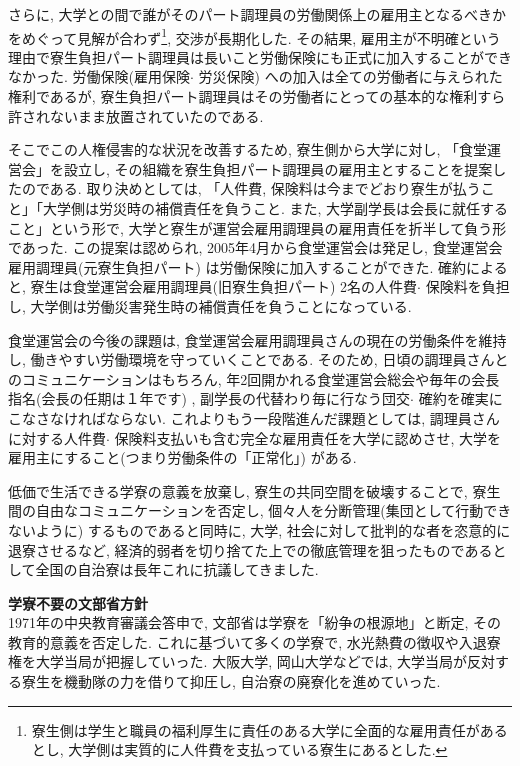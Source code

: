 \documentclass[10pt,b5jsbook,dvips,dvipdfmx,openany]{jsbook}
\theoremstyle{definition}
\begin{document}
		さらに, 大学との間で誰がそのパート調理員の労働関係上の雇用主となるべきかをめぐって見解が合わず\footnote{寮生側は学生と職員の福利厚生に責任のある大学に全面的な雇用責任があるとし, 大学側は実質的に人件費を支払っている寮生にあるとした. }, 交渉が長期化した. その結果, 雇用主が不明確という理由で寮生負担パート調理員は長いこと労働保険にも正式に加入することができなかった. 労働保険(雇用保険$ \cdot $ 労災保険) への加入は全ての労働者に与えられた権利であるが, 寮生負担パート調理員はその労働者にとっての基本的な権利すら許されないまま放置されていたのである. 

		そこでこの人権侵害的な状況を改善するため, 寮生側から大学に対し, 「食堂運営会」を設立し, その組織を寮生負担パート調理員の雇用主とすることを提案したのである. 取り決めとしては, 「人件費, 保険料は今までどおり寮生が払うこと」「大学側は労災時の補償責任を負うこと. また, 大学副学長は会長に就任すること」という形で, 大学と寮生が運営会雇用調理員の雇用責任を折半して負う形であった. この提案は認められ, 2005年4月から食堂運営会は発足し, 食堂運営会雇用調理員(元寮生負担パート) は労働保険に加入することができた. 確約によると, 寮生は食堂運営会雇用調理員(旧寮生負担パート) 2名の人件費$ \cdot $ 保険料を負担し, 大学側は労働災害発生時の補償責任を負うことになっている. 

		食堂運営会の今後の課題は, 食堂運営会雇用調理員さんの現在の労働条件を維持し, 働きやすい労働環境を守っていくことである. そのため, 日頃の調理員さんとのコミュニケーションはもちろん, 年2回開かれる食堂運営会総会や毎年の会長指名(会長の任期は１年です) , 副学長の代替わり毎に行なう団交$ \cdot $ 確約を確実にこなさなければならない. これよりもう一段階進んだ課題としては, 調理員さんに対する人件費$ \cdot $ 保険料支払いも含む完全な雇用責任を大学に認めさせ, 大学を雇用主にすること(つまり労働条件の「正常化」) がある. 

		低価で生活できる学寮の意義を放棄し, 寮生の共同空間を破壊することで, 寮生間の自由なコミュニケーションを否定し, 個々人を分断管理(集団として行動できないように) するものであると同時に, 大学, 社会に対して批判的な者を恣意的に退寮させるなど, 経済的弱者を切り捨てた上での徹底管理を狙ったものであるとして全国の自治寮は長年これに抗議してきました. 

		\begin{shadebox}
		\textbf{学寮不要の文部省方針} \\
		1971年の中央教育審議会答申で, 文部省は学寮を「紛争の根源地」と断定, その教育的意義を否定した. これに基づいて多くの学寮で, 水光熱費の徴収や入退寮権を大学当局が把握していった. 大阪大学, 岡山大学などでは, 大学当局が反対する寮生を機動隊の力を借りて抑圧し, 自治寮の廃寮化を進めていった. 
		\end{shadebox}
\end{document}
